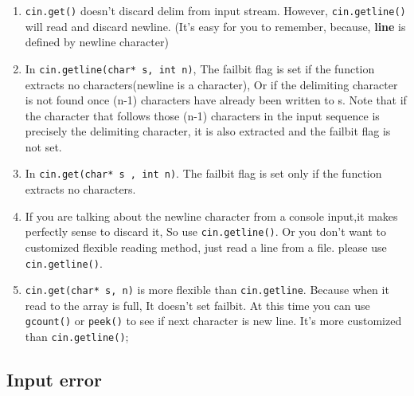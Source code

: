 \documentclass[a4paper,11pt,twoside]{book}
\begin{document}
\begin{itemize}
\begin{enumerate}
		\item \texttt{cin.get()} doesn't discard delim from input stream. However, \texttt{cin.getline()} will read and discard newline.  (It's easy for you to remember, because, \textbf{line} is defined by newline character)
		
		\item In \texttt{cin.getline(char* s, int n)}, The failbit flag is set if the function extracts no characters(newline is a character), Or if the delimiting character is not found once (n-1) characters have already been written to s. Note that if the character that follows those (n-1) characters in the input sequence is precisely the delimiting character, it is also extracted and the failbit flag is not set.
		
		\item In \texttt{cin.get(char* s ,  int n)}. The failbit flag is set only if the function extracts no characters.
		
		\item If you are talking about the newline character from a console input,it makes perfectly sense to discard it, So use \texttt{cin.getline()}. Or you don't want to customized flexible reading method, just read a line from a file. please use \texttt{cin.getline()}.
		
		\item \texttt{cin.get(char* s, n)} is more flexible than \texttt{cin.getline}. Because when it read to the array is full, It doesn't set failbit. At this time you can use \texttt{gcount()} or \texttt{peek()} to see if next character is new line. It's more customized than  \texttt{cin.getline()};
	\end{enumerate}
	
\end{itemize}

\subsection{Input error}
\end{document}
